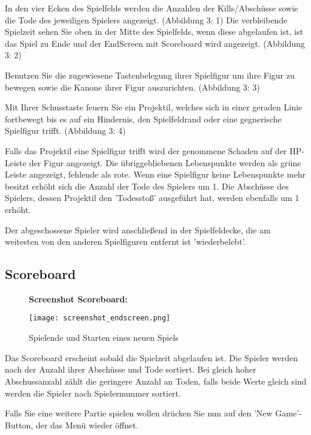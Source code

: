 \documentclass[a4paper]{scrartcl}
\begin{document}
In den vier Ecken des Spielfelds werden die Anzahlen der Kills/Abschüsse sowie die Tode des jeweiligen Spielers angezeigt. (Abbildung 3: 1)
Die verbleibende Spielzeit sehen Sie oben in der Mitte des Spielfelds, wenn diese abgelaufen ist, ist das Spiel zu Ende und der EndScreen mit Scoreboard wird angezeigt. (Abbildung 3: 2)

Benutzen Sie die zugewiesene Tastenbelegung ihrer Spielfigur um ihre Figur zu bewegen sowie die Kanone ihrer Figur auszurichten. (Abbildung 3: 3) 

Mit Ihrer Schusstaste feuern Sie ein Projektil, welches sich in einer geraden Linie fortbewegt bis es auf ein Hindernis, den Spielfeldrand oder eine gegnerische Spielfigur trifft. (Abbildung 3: 4)

Falls das Projektil eine Spielfigur trifft wird der genommene Schaden auf der HP-Leiste der Figur angezeigt. Die übriggebliebenen Lebenspunkte werden als grüne Leiste angezeigt, fehlende als rote.
Wenn eine Spielfigur keine Lebenspunkte mehr besitzt erhöht sich die Anzahl der Tode des Spielers um 1. Die Abschüsse des Spielers, dessen Projektil den 'Todesstoß' ausgeführt hat, werden ebenfalls um 1 erhöht.

Der abgeschossene Spieler wird anschließend in der Spielfeldecke, die am weitesten von den anderen Spielfiguren entfernt ist 'wiederbelebt'.

\newpage
\subsection{Scoreboard}
\begin{figure}[H]
  \textbf{Screenshot Scoreboard:}\par\medskip
  \centering
\texttt{[image: screenshot\_endscreen.png]}    
\caption{Spielende und Starten eines neuen Spiels}
\end{figure}


Das Scoreboard erscheint sobald die Spielzeit abgelaufen ist. Die Spieler werden nach der Anzahl ihrer Abschüsse und Tode sortiert. Bei gleich hoher Abschussanzahl zählt die geringere Anzahl an Toden, falls beide Werte gleich sind werden die Spieler nach Spielernummer sortiert.

Falls Sie eine weitere Partie spielen wollen drücken Sie nun auf den 'New Game'-Button, der das Menü wieder öffnet.
\end{document}
